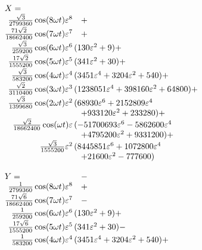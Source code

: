 $$
\begin{array}{rl}
X = \hfill &\\
\frac{\sqrt{3}}{\mathstrut 2799360}\cos(8 \omega t)\varepsilon^8&  + \\
\frac{\mathstrut 71\sqrt{2}}{\mathstrut 18662400}\cos(7 \omega t)\varepsilon^7& 
+ \\
\frac{\mathstrut \sqrt{3}}{\mathstrut 259200}\cos(6 \omega t)\varepsilon^6
&{}\!\!\!\!\!(130\varepsilon^2 + 9)  + \\
\frac{\mathstrut 17\sqrt{2}}{\mathstrut 1555200}\cos(5 \omega t)\varepsilon^5
&{}\!\!\!\!\!(341\varepsilon^2 + 30)  +\\ 
\frac{\mathstrut \sqrt{3}}{\mathstrut 583200}\cos(4 \omega t)\varepsilon^4
&{}\!\!\!\!\!(3451\varepsilon^4 + 3204\varepsilon^2 + 540) + \\
\frac{\mathstrut \sqrt{2}}{\mathstrut 3110400 }\cos(3 \omega t)\varepsilon^3
&{}\!\!\!\!\!(1238051\varepsilon^4 + 398160\varepsilon^2 + 64800) + \\
\frac{\mathstrut \sqrt{3}}{1399680}\cos(2 \omega t)\varepsilon^2
&{}\!\!\!\!\!(68930\varepsilon^6 
            + 2152809\varepsilon^4 \\
&           + 933120\varepsilon^2  + 233280)  + \\
\frac{\sqrt{2}}{18662400}\cos( \omega t)\varepsilon
&{}\!\!\!\!\!(- 51700693\varepsilon^6
            - 5862600\varepsilon^4 \\
&           + 4795200\varepsilon^2 + 9331200)  + \\
\frac{\sqrt{3}}{1555200}\varepsilon^2
&{}\!\!\!\!\!(8445851\varepsilon^6 + 1072800\varepsilon^4 \\ 
&           + 21600\varepsilon^2 - 777600)\\
&\\
Y =\hfill&- \\
\frac{1}{\mathstrut 2799360}\cos(8 \omega t)\varepsilon^8&  + \\
\frac{\mathstrut 71\sqrt{6}}{\mathstrut 18662400}\cos(7 \omega t)\varepsilon^7& 
- \\
\frac{\mathstrut 1}{\mathstrut 259200}\cos(6 \omega t)\varepsilon^6
&{}\!\!\!\!\!(130\varepsilon^2 + 9)  + \\ 
\frac{\mathstrut 17\sqrt{6}}{\mathstrut 1555200}\cos(5 \omega t)\varepsilon^5
&{}\!\!\!\!\!(341\varepsilon^2 + 30) - \\
\frac{\mathstrut 1}{\mathstrut 583200}\cos(4 \omega t)\varepsilon^4
&{}\!\!\!\!\!(3451\varepsilon^4 + 3204\varepsilon^2 + 540)  + \\

\end{array}$$
